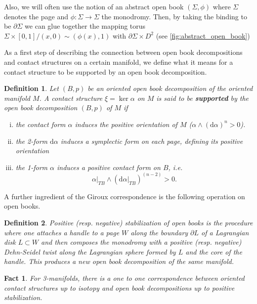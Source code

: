 \documentclass{amsart}
\newtheorem{definition}{Definition}
\newtheorem{fact}{Fact}
\renewcommand*{\d}{\mathrm{d}}
\begin{document}
Also, we will often use the notion of an abstract open book $(\Sigma, \phi)$
where $\Sigma$ denotes the page and $\phi: \Sigma \to \Sigma$ the monodromy.
Then, by taking the binding to be $\partial \Sigma$ we can glue together the 
mapping torus $\Sigma \times [0,1] / (x, 0) \sim (\phi(x), 1)$
with $\partial \Sigma \times D^2$ (see \cref{fig:abstract_open_book})

As a first step of describing the connection between open book decompositions and 
contact structures on a certain manifold, we define what it means for a contact structure to be
supported by an open book decomposition.
\begin{definition}\label{def:support}\cite{Geiges08}
    Let $(B,p)$ be an oriented open book decomposition of the oriented manifold $M$.
    A contact structure $\xi = \ker \alpha$ on $M$ is said to be \textbf{supported} by the open book decomposition $(B,p)$ of $M$ if
    \begin{enumerate}[(i)]
        \item the contact form $\alpha$ induces the positive orientation of $M$ ($\alpha \wedge (\d \alpha)^n > 0$).
        \item the 2-form $\d \alpha$ induces a symplectic form on each page, defining its positive orientation
        \item the 1-form $\alpha$ induces a positive contact form on $B$, i.e. 
        \[ 
            \alpha|_{TB} \wedge (\d \alpha|_{TB})^{(n-2)} > 0.
        \]
    \end{enumerate}
\end{definition}

A further ingredient of the Giroux correspondence is the following operation on open books.
\begin{definition}\cite{Koert17}
    Positive (resp. negative) \textit{stabilization of open books} is the procedure where
    one attaches a handle to a page $W$ along the boundary $\partial L$ of a Lagrangian disk $L\subset W$ and then composes the monodromy with
    a positive (resp. negative) Dehn-Seidel twist along the Lagrangian sphere formed by $L$ 
    and the core of the handle.
    This produces a new open book decomposition of the same manifold.
\end{definition}

\begin{fact}\cite{Giroux02}
For 3-manifolds, there is a one to one correspondence between oriented contact structures up to isotopy
and open book decompositions up to positive stabilization.
\end{fact}
\end{document}
